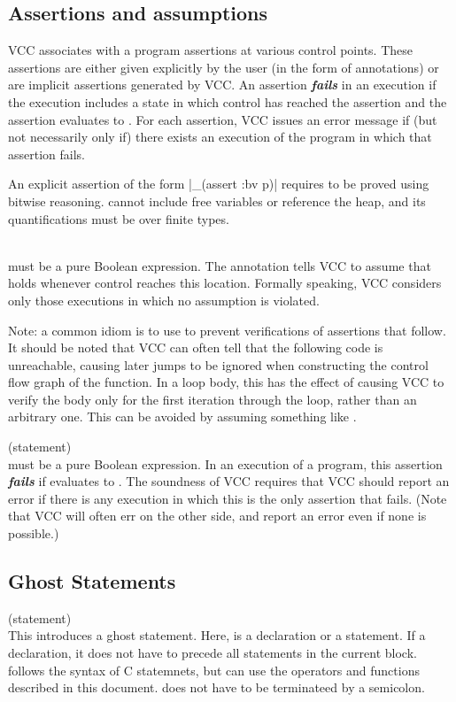 \documentclass[preprint,nocopyrightspace]{sigplanconf}
\newcommand{\Def}[1]{\textit{\textbf{#1}}}
\begin{document}
{{{{\begin{VCC}
\subsection{Assertions and assumptions}
VCC associates with a program assertions at various control
points. These assertions are either given explicitly by the user (in
the form of  annotations) or are implicit assertions
generated by VCC. An assertion \Def{fails} in an execution if the
execution includes a state in which control has reached the assertion
and the assertion evaluates to . For each assertion, VCC issues an
error message if (but not necessarily only if) there exists an
execution of the program in which that assertion fails.

An explicit assertion of the form \vcc|_(assert {:bv} p)|
requires  to be proved using bitwise reasoning. 
cannot include free variables or reference the heap, and its
quantifications must be over finite types.

\\
 must be a pure Boolean
expression. The annotation tells VCC to assume that  holds
whenever control reaches this location. Formally speaking, VCC
considers only those executions in which no assumption is violated.

Note: a common idiom is to use  to prevent
verifications of assertions that follow. It should be noted that VCC
can often tell that the following code is unreachable, causing later
jumps to be ignored when constructing the control flow graph of the
function. In a loop body, this has the effect of causing VCC to verify
the body only for the first iteration through the loop, rather than an
arbitrary one. This can be avoided by assuming something like 
.

 (statement)\\
 must be a pure Boolean
expression. In an execution of a program, this assertion \Def{fails}
if  evaluates to . The soundness of VCC requires that
VCC should report an error if there is any execution in which this is
the only assertion that fails. (Note that VCC will often err on the
other side, and report an error even if none is possible.)

\subsection{Ghost Statements}
 (statement)\\
This introduces a ghost statement.
Here,  is a declaration or a statement. If a declaration,
it does not have to precede all statements in the current block.
 follows the syntax of C statemnets, but can use the
operators and functions described in this document.  does
not have to be terminateed by a semicolon.


\end{VCC}}}}}
\end{document}
